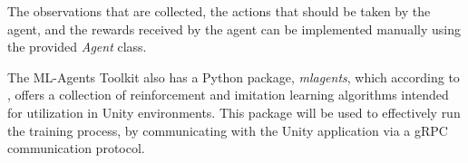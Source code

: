 The observations that are collected, the actions that should be taken by the agent, and the rewards received by the agent can be implemented manually using the provided \emph{Agent} class.

The ML-Agents Toolkit also has a Python package, \emph{mlagents}, which according to \cite{mlagents_pypi}, offers a collection of reinforcement and imitation learning algorithms intended for utilization in Unity environments. This package will be used to effectively run the training process, by communicating with the Unity application via a gRPC communication protocol.


